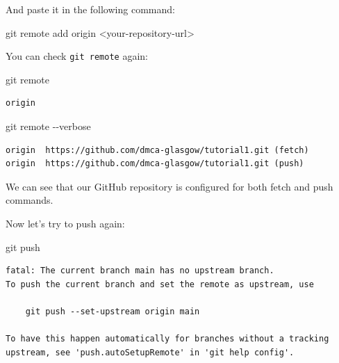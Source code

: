\documentclass[
  letterpaper,
  DIV=11,
  numbers=noendperiod]{scrartcl}
\newenvironment{Shaded}{\begin{snugshade}}{\end{snugshade}}
\newcommand{\NormalTok}[1]{\textcolor[rgb]{0.00,0.23,0.31}{#1}}
\newcommand{\SpecialCharTok}[1]{\textcolor[rgb]{0.37,0.37,0.37}{#1}}
\begin{document}
And paste it in the following command:

\begin{Shaded}
\begin{Highlighting}[]
\NormalTok{git remote add origin }\SpecialCharTok{\textless{}}\NormalTok{your}\SpecialCharTok{{-}}\NormalTok{repository}\SpecialCharTok{{-}}\NormalTok{url}\SpecialCharTok{\textgreater{}}
\end{Highlighting}
\end{Shaded}

You can check \texttt{git\ remote} again:

\begin{Shaded}
\begin{Highlighting}[]
\NormalTok{git remote}
\end{Highlighting}
\end{Shaded}

\begin{verbatim}
origin
\end{verbatim}

\begin{Shaded}
\begin{Highlighting}[]
\NormalTok{git remote }\SpecialCharTok{{-}{-}}\NormalTok{verbose}
\end{Highlighting}
\end{Shaded}

\begin{verbatim}
origin  https://github.com/dmca-glasgow/tutorial1.git (fetch)
origin  https://github.com/dmca-glasgow/tutorial1.git (push)
\end{verbatim}

We can see that our GitHub repository is configured for both fetch and
push commands.

Now let's try to push again:

\begin{Shaded}
\begin{Highlighting}[]
\NormalTok{git push}
\end{Highlighting}
\end{Shaded}

\begin{verbatim}
fatal: The current branch main has no upstream branch.
To push the current branch and set the remote as upstream, use

    git push --set-upstream origin main

To have this happen automatically for branches without a tracking
upstream, see 'push.autoSetupRemote' in 'git help config'.
\end{verbatim}
\end{document}
